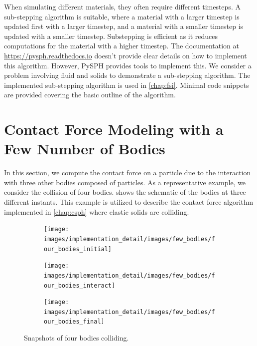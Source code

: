 When simulating different materials, they often require different timesteps. A
sub-stepping algorithm is suitable, where a material with a larger timestep is
updated first with a larger timestep, and a material with a smaller timestep is
updated with a smaller timestep. Substepping is efficient as it reduces
computations for the material with a higher timestep. The documentation at
\url{https://pysph.readthedocs.io} doesn't provide clear details on how to
implement this algorithm. However, PySPH provides tools to implement this. We
consider a problem involving fluid and solids to demonstrate a sub-stepping
algorithm. The implemented sub-stepping algorithm is used in \cref{chap:fsi}.
Minimal code snippets are provided covering the basic outline of the algorithm.


\FloatBarrier%
\section{Contact Force Modeling with a Few Number of Bodies}
\label{sec:tracking-few-bodies}
In this section, we compute the contact force on a particle due to the
interaction with three other bodies composed of particles. As a representative
example, we consider the collision of four bodies. 
shows the schematic of the bodies at three different instants. This example is
utilized to describe the contact force algorithm implemented in \cref{chap:csph}
where elastic solids are colliding.
\begin{figure}[!htpb]
  \centering
  \begin{subfigure}{0.32\textwidth}
    \centering
    \texttt{[image: images/implementation\_detail/images/few\_bodies/four\_bodies\_initial]}
  \end{subfigure}
  \begin{subfigure}{0.32\textwidth}
    \centering
    \texttt{[image: images/implementation\_detail/images/few\_bodies/four\_bodies\_interact]}
  \end{subfigure}
  \begin{subfigure}{0.32\textwidth}
    \centering
    \texttt{[image: images/implementation\_detail/images/few\_bodies/four\_bodies\_final]}
  \end{subfigure}
  \caption{Snapshots of four bodies colliding.}
\label{fig:id:four_bodies_contact}
\end{figure}


